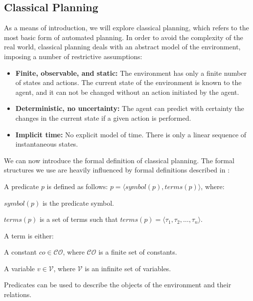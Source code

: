 \subsection{Classical Planning}

As a means of introduction, we will explore classical planning, 
which refers to the most basic form of automated planning.
In order to avoid the complexity of the real world, classical 
planning deals with an abstract model of the environment, 
imposing a number of restrictive assumptions:

\begin{itemize}
    \item 
    \textbf{Finite, observable, and static:}
    The environment has only a finite number of states and actions. The current state of the environment is known to the agent, and it can not be changed without an action initiated by the agent.

    \item 
    \textbf{Deterministic, no uncertainty:}
    The agent can predict with certainty the changes in the current state if a given action is performed.

    \item 
    \textbf{Implicit time:}
    No explicit model of time. There is only a linear sequence of instantaneous states.
\end{itemize}

We can now introduce the formal definition of classical planning. 
The formal structures we use are heavily influenced by formal definitions 
described in \cite{AutomatedPlanningTheoryghallab2006}\cite{OverviewHierarchicalTaskgeorgievski2014}\cite{alnazer2019htn}:


\begin{Tdef}[Predicate]
    A predicate $p$ is defined as follows: $p= \langle symbol(p), terms(p) \rangle$, where:
    \vspace{-0.5em}
    \begin{compactitem} 
        \item 
        $symbol(p)$ is the predicate symbol.
        \item 
        $terms(p)$ is a set of terms such that $terms(p) = \langle \tau_1, \tau_2, \dots, \tau_n \rangle$.
        \item 
        A term is either:
        \begin{compactitem}
            \item 
            A constant $co \in \mathcal{CO}$, where $\mathcal{CO}$ is a finite set of constants.
            \item 
            A variable $v \in \mathcal{V}$, where $\mathcal{V}$ is an infinite set of variables.
        \end{compactitem}
    \end{compactitem}
    \vspace{-0.5em}
    Predicates can be used to describe the objects of the environment and their relations.
\end{Tdef}

